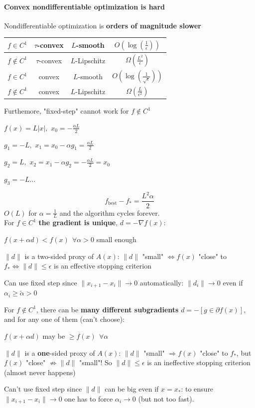 \documentclass[10pt]{report}
\begin{document}
\paragraph{Convex nondifferentiable optimization is hard} Nondifferentiable optimization is \textbf{orders of magnitude slower}
\begin{center}
	\begin{tabular}{c | c | c | c}
	$f\in C^1$&$\tau$-convex&$L$-smooth&$O\left(\log\left(\frac{1}{\epsilon}\right)\right)$\\
	\hline
	$f\not\in C^1$&$\tau$-convex&$L$-Lipschitz&$\Omega\left(\frac{L^2}{\epsilon}\right)$\\
	\hline
	$f\in C^1$&convex&$L$-smooth&$O\left(\log\left(\frac{1}{\sqrt{\epsilon}}\right)\right)$\\
	\hline
	$f\not\in C^1$&convex&$L$-Lipschitz&$\Omega\left(\frac{L}{\epsilon^2}\right)$
	\end{tabular}
\end{center}
Furthemore, "fixed-step" cannot work for $f\not\in C^1$
\begin{list}{}{}
	\item $f(x) = L|x|,$ $x_0 =-\frac{\alpha L}{2}$
	\item $g_1 = -L,$ $x_1 = x_0 - \alpha g_1 = \frac{\alpha L}{2}$
	\item $g_2 = L,$ $x_2 = x_1 - \alpha g_2 = -\frac{\alpha L}{2} = x_0$
	\item $g_3 = -L\ldots$
\end{list}
$$f_{\text{best}} - f_* = \frac{L^2\alpha}{2}$$
$O(L)$ for $\alpha=\frac{1}{L}$ and the algorithm cycles forever.\\
For $f\in C^1$ \textbf{the gradient is unique}, $d=-\nabla f(x)$:
\begin{list}{}{}
	\item $f(x+\alpha d) < f(x)\:\:\forall\alpha > 0$ small enough
	\item $\|d\|$ is a two-sided proxy of $A(x)$: $\|d\|$ "small" $\Leftrightarrow f(x)$ "close" to $f_*\Leftrightarrow \|d\|\leq \epsilon$ is an effective stopping criterion
	\item Can use fixed step since $\|x_{i+1}-x_i\|\rightarrow 0$ automatically: $\|d_i\|\rightarrow 0$ even if $\alpha_i \geq \tilde{\alpha} > 0$
\end{list}
For $f\not\in C^1$, there can be \textbf{many different subgradients} $d = -[g\in\partial f(x)]$, and for any one of them (can't choose):
\begin{list}{}{}
	\item $f(x+\alpha d)$ may be $\geq f(x)\:\:\forall\alpha$
	\item $\|d\|$ is a \textbf{one}-sided proxy of $A(x)$: $\|d\|$ "small" $\Rightarrow f(x)$ "close" to $f_*$, but $f(x)$ "close" $\not\Rightarrow \|d\|$ "small"! So $\|d\|\leq \epsilon$ is an ineffective stopping criterion (almost never happens)
	\item Can't use fixed step since $\|d\|$ can be big even if $x = x_*$: to ensure $\|x_{i+1}-x_i\|\rightarrow 0$ one has to force $\alpha_i\rightarrow 0$ (but not too fast).
\end{list}
\end{document}
